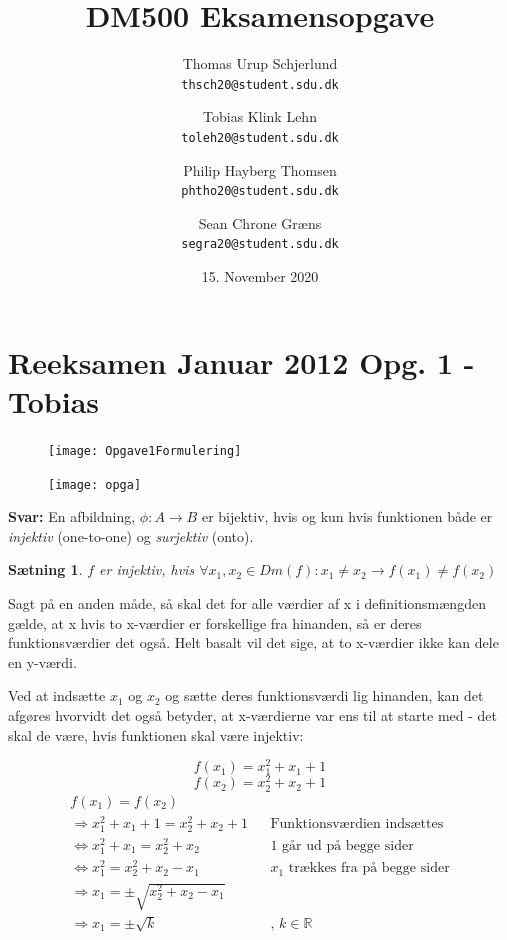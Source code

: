 \documentclass{article}
\title{DM500 Eksamensopgave}
\author{
	Thomas Urup Schjerlund\\
	\texttt{thsch20@student.sdu.dk}
	\and
	Tobias Klink Lehn\\
	\texttt{toleh20@student.sdu.dk}
	\and
	Philip Hayberg Thomsen\\
	\texttt{phtho20@student.sdu.dk}
	\and
	Sean Chrone Græns\\
	\texttt{segra20@student.sdu.dk}
}
\date{15. November 2020}
\newtheorem{theorem}{Sætning}
\begin{document}
\begin{titlepage}
\maketitle
\end{titlepage}

\section{Reeksamen Januar 2012 Opg. 1 - Tobias}
\begin{figure}[h]
\texttt{[image: Opgave1Formulering]}
\end{figure}

\begin{figure}[h]
\texttt{[image: opga]}
\end{figure}
\textbf{Svar:}
En afbildning, $\phi: A \rightarrow B$ er bijektiv, hvis og kun hvis funktionen både er \emph{injektiv} (one-to-one) og \emph{surjektiv} (onto).

\begin{theorem}
$f$ er injektiv, hvis $\forall x_1, x_2 \in Dm(f): x_1 \neq x_2 \rightarrow f(x_1) \neq f(x_2)$
\end{theorem}

Sagt på en anden måde, så skal det for alle værdier af x i definitionsmængden gælde, at x hvis to x-værdier er forskellige fra hinanden, så er deres funktionsværdier det også. Helt basalt vil det sige, at to x-værdier ikke kan dele en y-værdi.

Ved at indsætte $x_1$ og $x_2$ og sætte deres funktionsværdi lig hinanden, kan det afgøres hvorvidt det også betyder, at x-værdierne var ens til at starte med - det skal de være, hvis funktionen skal være injektiv:
\begin{center}
\[f(x_1) = x_1^2 + x_1 + 1 \] 
\[ f(x_2)=x_2^2 + x_2 + 1 \] 
\begin{align*}
f(x_1) = f(x_2) \\
\Rightarrow x^2_1 + x_1 + 1 = x^2_2 + x_2 + 1 && \text{Funktionsværdien indsættes} \\
\Leftrightarrow x^2_1 + x_1 = x^2_2 + x_2 && \text{1 går ud på begge sider} \\
\Leftrightarrow x_1^2 = x_2^2 + x_2 - x_1 && \text{$x_1$ trækkes fra på begge sider}\\
\Rightarrow x_1 = \pm\sqrt{x_2^2 + x_2 - x_1} \\
\Rightarrow x_1 = \pm\sqrt{k}  && \text{, $k \in \mathbb{R}$}
\end{align*}
\end{center}
\end{document}
